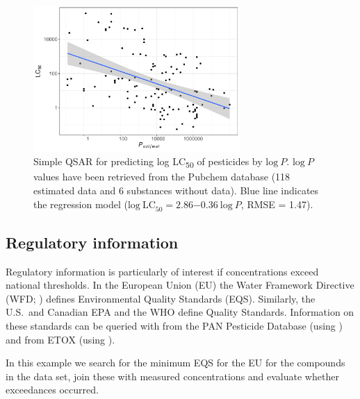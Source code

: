 \documentclass[article]{jss}
\begin{document}
\begin{figure}[t!]
  \centering
  \includegraphics[width=0.7\textwidth]{plot_qsar-1} 
  \caption{Simple QSAR for predicting log LC\textsubscript{50} of
    pesticides by $\mathrm{log}~P$.  $\mathrm{log}~P$ values have been
    retrieved from the Pubchem database (118 estimated data and 6 substances without data).  Blue line
    indicates the regression model
    ($\mathrm{log~LC}_{50} = 2.86\ensuremath{-0.36}~\mathrm{log}~P$,
    RMSE = 1.47).}
\label{fig:fig3}
\end{figure}


\subsection[Regulatory information]{Regulatory information}
Regulatory information is particularly of interest if concentrations
exceed national thresholds.  In the European Union (EU) the Water
Framework Directive (WFD; \citealt{wfd2000directive}) defines
Environmental Quality Standards (EQS).  Similarly, the U.S.\ and
Canadian EPA and the WHO define Quality Standards.  Information on
these standards can be queried with  from the PAN
Pesticide Database (using ) and from ETOX (using
).

In this example we search for the minimum EQS for the EU for the
compounds in the  data set, join these with measured
concentrations and evaluate whether exceedances occurred.
\end{document}
